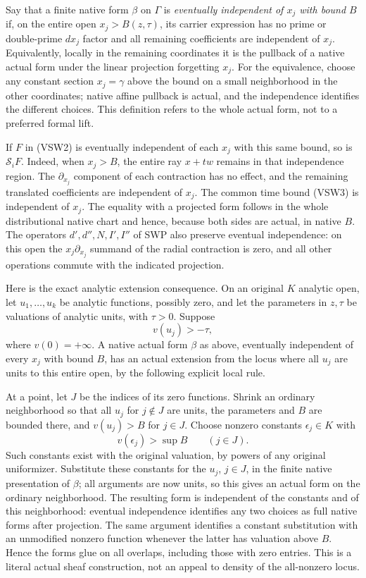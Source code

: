 Say that a finite native form $\beta$ on $\Gamma$ is
\emph{eventually independent of $x_j$ with bound $B$} if, on
the entire open $x_j>B(z,\tau)$, its carrier expression has no
prime or double-prime $dx_j$ factor and all remaining coefficients
are independent of $x_j$.  Equivalently, locally in the remaining
coordinates it is the pullback of a native actual form under the
linear projection forgetting $x_j$.  For the equivalence, choose
any constant section $x_j=\gamma$ above the bound on a small
neighborhood in the other coordinates; native affine pullback is
actual, and the independence identifies the different choices.
This definition refers to the whole actual form, not to a preferred
formal lift.

If $F$ in (VSW2) is eventually independent of each $x_j$ with
this same bound, so is $\mathcal S_iF$.  Indeed, when $x_j>B$,
the entire ray $x+tw$ remains in that independence region.
The $\partial_{x_j}$ component of each contraction has no effect,
and the remaining translated coefficients are independent of $x_j$.
The common time bound (VSW3) is independent of $x_j$.  The equality
with a projected form follows in the whole distributional native
chart and hence, because both sides are actual, in native $B$.
The operators $d',d'',N,I',I''$ of SWP also preserve eventual
independence: on this open the $x_j\partial_{x_j}$ summand of
the radial contraction is zero, and all other operations commute
with the indicated projection.

Here is the exact analytic extension consequence.  On an original
$K$ analytic open, let $u_1,\ldots,u_k$ be analytic functions,
possibly zero, and let the parameters in $z,\tau$ be valuations
of analytic units, with $\tau>0$.  Suppose
\[
                  v(u_j)>-\tau,
 \tag{VSW9}
\]
where $v(0)=+\infty$.  A native actual form $\beta$ as above,
eventually independent of every $x_j$ with bound $B$, has an actual
extension from the locus where all $u_j$ are units to this entire
open, by the following explicit local rule.

At a point, let $J$ be the indices of its zero functions.
Shrink an ordinary neighborhood so that all $u_j$ for $j\notin J$
are units, the parameters and $B$ are bounded there, and
$v(u_j)>B$ for $j\in J$.  Choose nonzero constants
$\epsilon_j\in K$ with
\[
             v(\epsilon_j)>\sup B\qquad(j\in J).
 \tag{VSW10}
\]
Such constants exist with the original valuation, by powers of
any original uniformizer.  Substitute these constants for the
$u_j$, $j\in J$, in the finite native presentation of $\beta$;
all arguments are now units, so this gives an actual form on the
ordinary neighborhood.  The resulting form is independent of
the constants and of this neighborhood: eventual independence
identifies any two choices as full native forms after projection.
The same argument identifies a constant substitution with an
unmodified nonzero function whenever the latter has valuation
above $B$.  Hence the forms glue on all overlaps, including those
with zero entries.  This is a literal actual sheaf construction,
not an appeal to density of the all-nonzero locus.


